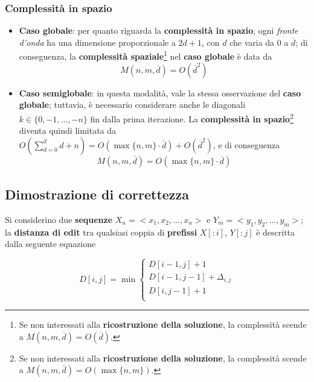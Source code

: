 \subsubsection{Complessità in spazio}
    \begin{itemize}
        \item \textbf{Caso globale}: per quanto riguarda la \textbf{complessità in spazio}, ogni \emph{fronte d'onda} ha una dimensione proporzionale a $2d + 1$, con $d$ che varia da 0 a $\overline{d}$; di conseguenza, la \textbf{complessità spaziale}\footnote{Se non interessati alla \textbf{ricostruzione della soluzione}, la complessità scende a $M(n, m, \overline{d}) = O(\overline{d})$.} nel \textbf{caso globale} è data da
        \begin{equation}
            M(n , m, \overline{d}) = O(\overline{d}^2)
        \label{equation:wfa_global_space_complexity}
        \end{equation}

        \item \textbf{Caso semiglobale}: in questa modalità, vale la stessa osservazione del \textbf{caso globale}; tuttavia, è necessario considerare anche le diagonali $k \in \{0, -1, ..., -n\}$ fin dalla prima iterazione. La \textbf{complessità in spazio}\footnote{Se non interessati alla \textbf{ricostruzione della soluzione}, la complessità scende a $M(n, m, \overline{d}) = O(\max\{n, m\})$.} diventa quindi limitata da $O(\sum_{d=0}^{\overline{d}}{d+n}) = O(\max\{n, m\} \cdot \overline{d}) + O(\overline{d}^2)$, e di conseguenza
        \begin{equation}
            M(n , m, \overline{d}) = O(\max\{n, m\} \cdot \overline{d})
        \label{equation:wfa_semiglobal_space_complexity}
        \end{equation}
        
    \end{itemize}
    

\subsection{Dimostrazione di correttezza}
    Si considerino due \textbf{sequenze} $X_n = <x_1, x_2, ..., x_n>$ e $Y_m = <y_1, y_2, ..., y_m>$; la \textbf{distanza di edit} tra qualsiasi coppia di \textbf{prefissi} $X[:i]$, $Y[:j]$ è descritta dalla seguente equazione
    
    \begin{equation*}
        D[i,j] = \min \begin{cases}
            D[i-1,j] + 1 \\
            D[i-1,j-1] + \Delta_{i,j} \\
            D[i,j-1] + 1 \\
        \end{cases}
    \end{equation*}
    
